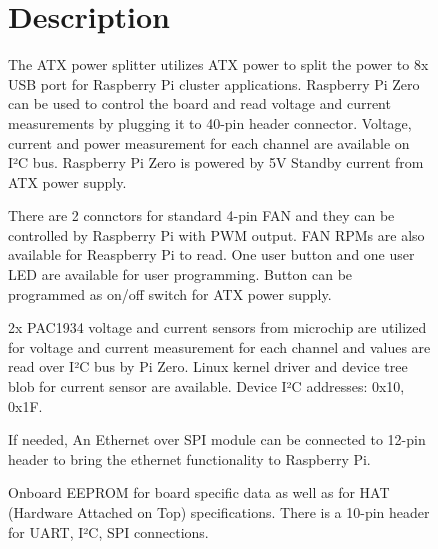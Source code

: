 \documentclass[a4paper,14pt,oneside,pdflatex,english,final,twocolumn]{article}
\begin{document}
\begin{figure}[ht]
	\begin{minipage}{1\textwidth}
		\section{Description}
		\par
		The ATX power splitter utilizes ATX power to split the power to 8x USB port for Raspberry Pi cluster applications. Raspberry Pi Zero can be used to control the board and read voltage and current measurements by plugging it to 40-pin header connector. Voltage, current and power measurement for each channel are available on I²C bus. Raspberry Pi Zero is powered by 5V Standby current from ATX power supply. 
		\par There are 2 connctors for standard 4-pin FAN and they can be controlled by Raspberry Pi with PWM output. FAN RPMs are also available for Reaspberry Pi to read. One user button and one user LED are available for user programming. Button can be programmed as on/off switch for ATX power supply. 
		\par
		2x PAC1934 voltage and current sensors from microchip are utilized for voltage and current measurement for each channel and values are read over I²C bus by Pi Zero. Linux kernel driver and device tree blob for current sensor are available. Device I²C addresses: 0x10, 0x1F.
		\par
		If needed, An Ethernet over SPI module can be connected to 12-pin header to bring the ethernet functionality to Raspberry Pi.
		\par 
		Onboard EEPROM for board specific data as well as for HAT (Hardware Attached on Top) specifications.
		There is a 10-pin header for UART, I²C, SPI connections.
	\end{minipage}


\end{figure}
\end{document}

